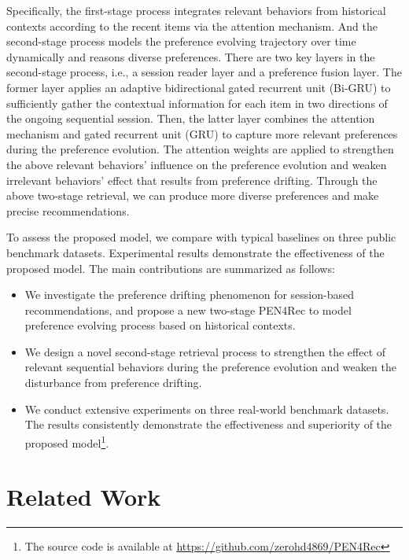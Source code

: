 \documentclass[runningheads]{llncs}
\begin{document}
Specifically, the {first-stage} process integrates relevant behaviors from historical contexts according to the recent items via the attention mechanism.
And the {second-stage} process models the preference evolving trajectory over time dynamically and reasons diverse preferences.
There are two key layers in the second-stage process, i.e., a session reader layer and a preference fusion layer.
The former layer applies an adaptive bidirectional gated recurrent unit (Bi-GRU) to sufficiently gather the contextual information for each item in two directions of the ongoing sequential session.
Then, the latter layer combines the attention mechanism and gated recurrent unit (GRU) to capture more relevant preferences during the preference evolution. 
The attention weights are applied to strengthen the above relevant behaviors' influence on the preference evolution and weaken irrelevant behaviors' effect that results from preference drifting. 
Through the above two-stage retrieval, we can produce more diverse preferences and make precise recommendations.
 

To assess the proposed model, we compare with typical baselines on three public benchmark datasets. Experimental results demonstrate the effectiveness of the proposed model. 
The main contributions are summarized as follows:
\begin{itemize} 
  \item We investigate the preference drifting phenomenon for session-based recommendations, and propose a new two-stage PEN4Rec to model preference evolving process based on historical contexts. 
  \item We design a novel second-stage retrieval process to strengthen the effect of relevant sequential behaviors during the preference evolution and weaken the disturbance from preference drifting.
  \item We conduct extensive experiments on three real-world benchmark datasets.
  The results consistently demonstrate the effectiveness and superiority of the proposed model\footnote{The source code is available at \url{https://github.com/zerohd4869/PEN4Rec}}.
\end{itemize}




\section{Related Work} \label{sec:related}
\end{document}
